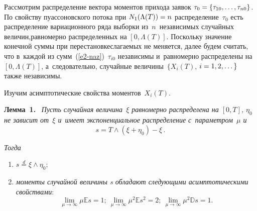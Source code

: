 \begin{multicols}{2}
Рассмотрим распределение вектора 
моментов прихода заявок $\tau_0\hm=\{\tau_{10},\ldots ,\tau_{n0}\}$. По свойству 
пуассоновского потока при $N_1(\Lambda(T))\hm=n$ распределение~$\tau_0$ 
есть распределение вариационного ряда выборки из~$n$~независимых случайных 
величин,\linebreak равномерно распределенных на $[0, \Lambda(T)]$.
Поскольку значение конечной суммы при перестановке\linebreak слагаемых не меняется, 
далее будем считать, что в~каждой из сумм~(\ref{e2-naz})~$\tau_{i0}$ 
независимы и~равномерно распределены на $[0, \Lambda(T)]$, а~следовательно, 
случайные величины~$\{X_i(T)$, $i\hm=1,2,\dots\}$ также независимы.

Изучим асимптотические свойства моментов~$X_i(T)$.

\smallskip

\noindent
\textbf{Лемма~1.}\ \textit{ Пусть случайная величина~$\xi$ 
равномерно распределена на $[0,T]$, $\eta_0$ не зависит от~$\xi$ и~имеет 
экспоненциальное распределение с~параметром~$\mu$ и}
\begin{equation*}
s = T\wedge\left(\xi+\eta_0\right)-\xi\,.
\end{equation*}

\vspace*{-8pt}

\noindent
\textit{Тогда}
\begin{enumerate}[(1)]
\item $s\stackrel{d}=\xi\wedge\eta_0$;
\item \textit{моменты случайной величины s обладают следующими асимптотическими 
свойствами}: 
\begin{equation*}
\lim\limits_{\mu\rightarrow\infty}\mu\mathbb{E}s = 1;\
 \lim\limits_{\mu\rightarrow\infty}\mu^2\mathbb{E}s^2 = 2;\
  \lim\limits_{\mu\rightarrow\infty}\mu^2\mathbb{D}s = 1.
\end{equation*}
\end{enumerate}


\end{multicols}

